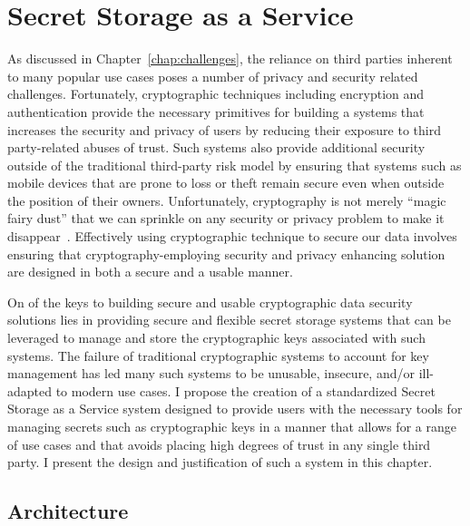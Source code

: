 \chapter{Secret Storage as a Service}
\label{chap:ssaas}

As discussed in Chapter~\ref{chap:challenges}, the reliance on third
parties inherent to many popular use cases poses a number of privacy
and security related challenges. Fortunately, cryptographic techniques
including encryption and authentication provide the necessary
primitives for building a systems that increases the security and
privacy of users by reducing their exposure to third party-related
abuses of trust. Such systems also provide additional security outside
of the traditional third-party risk model by ensuring that systems
such as mobile devices that are prone to loss or theft remain secure
even when outside the position of their owners. Unfortunately,
cryptography is not merely ``magic fairy dust'' that we can sprinkle
on any security or privacy problem to make it
disappear~\cite{smith2003}. Effectively using cryptographic technique
to secure our data involves ensuring that cryptography-employing
security and privacy enhancing solution are designed in both a secure
and a usable manner.

On of the keys to building secure and usable cryptographic data
security solutions lies in providing secure and flexible secret
storage systems that can be leveraged to manage and store the
cryptographic keys associated with such systems. The failure of
traditional cryptographic systems to account for key management has
led many such systems to be unusable, insecure, and/or ill-adapted to
modern use cases. I propose the creation of a standardized Secret
Storage as a Service system designed to provide users with the
necessary tools for managing secrets such as cryptographic keys in a
manner that allows for a range of use cases and that avoids placing
high degrees of trust in any single third party. I present the design
and justification of such a system in this chapter.

\section{Architecture}
\label{chap:ssaas:arch}


